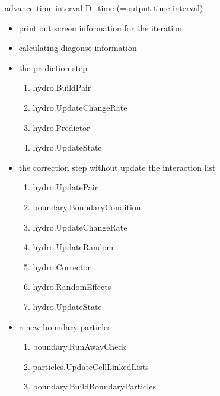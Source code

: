 advance time interval D\_\-time (=output time interval) 



\begin{itemize}
\item print out screen information for the iteration

\item calculating diagonse information

\item the prediction step

\begin{enumerate}
\item hydro.BuildPair

\item hydro.UpdateChangeRate

\item hydro.Predictor

\item hydro.UpdateState\end{enumerate}


\item the correction step without update the interaction list

\begin{enumerate}
\item hydro.UpdatePair

\item boundary.BoundaryCondition

\item hydro.UpdateChangeRate

\item hydro.UpdateRandom

\item hydro.Corrector

\item hydro.RandomEffects

\item hydro.UpdateState\end{enumerate}


\item renew boundary particles

\begin{enumerate}
\item boundary.RunAwayCheck

\item particles.UpdateCellLinkedLists

\item boundary.BuildBoundaryParticles\end{enumerate}
\end{itemize}


